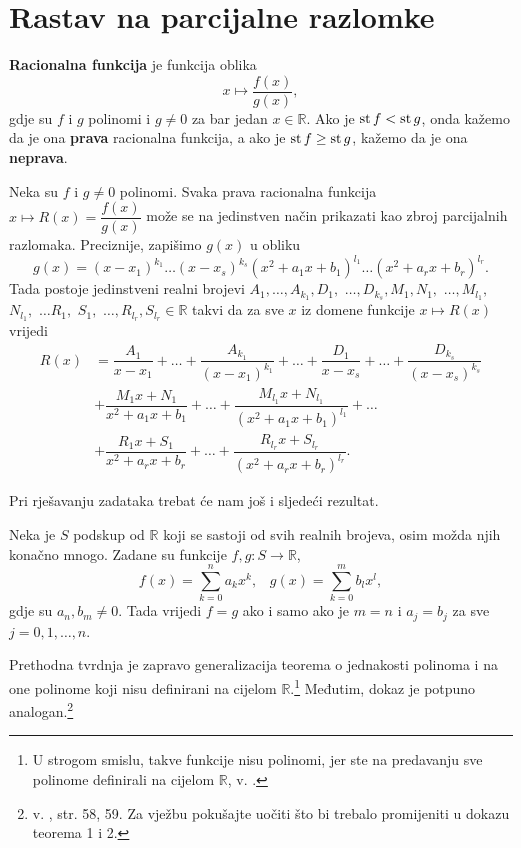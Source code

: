 \section{Rastav na parcijalne razlomke}

\begin{definition}
\textbf{Racionalna funkcija} je funkcija oblika
$$x\mapsto \dfrac{f(x)}{g(x)},$$
gdje su $f$ i $g$ polinomi i $g\neq 0$ za bar jedan $x\in \mathbb{R}$. Ako je $\operatorname{st}{f}<\operatorname{st}{g}$, onda kažemo da je ona \textbf{prava} racionalna funkcija, a ako je $\operatorname{st}{f}\geq \operatorname{st}{g}$, kažemo da je ona \textbf{neprava}.
\end{definition}

\begin{remark}
\label{partfrac}
Neka su $f$ i $g\neq 0$ polinomi. Svaka prava racionalna funkcija $x\mapsto R(x)=\dfrac{f(x)}{g(x)}$ može se na jedinstven način prikazati kao zbroj parcijalnih razlomaka. Preciznije, zapišimo $g(x)$ u obliku
$$g(x)=(x-x_1)^{k_1}\dots (x-x_s)^{k_s}(x^2+a_1x+b_1)^{l_1}\dots (x^2+a_rx+b_r)^{l_r}.$$
Tada postoje jedinstveni realni brojevi $A_1, \dots, A_{k_1}, D_1,$ $\dots, D_{k_s}, M_1, N_1,$ $ \dots, M_{l_1},$ $ N_{l_1},$ $ \dots R_1,$ $ S_1,$ $\dots, R_{l_r}, S_{l_r}\in \mathbb{R}$ takvi da za sve $x$ iz domene funkcije $x\mapsto R(x)$ vrijedi
\begin{align*}
R(x)&=\dfrac{A_1}{x-x_1}+\dots+\dfrac{A_{k_1}}{(x-x_1)^{k_1}}+\dots+\dfrac{D_1}{x-x_s}+\dots+\dfrac{D_{k_s}}{(x-x_s)^{k_s}} \\
&+\dfrac{M_1x+N_1}{x^2+a_1x+b_1}+\dots+\dfrac{M_{l_1}x+N_{l_1}}{(x^2+a_1x+b_1)^{l_1}}+\dots \\
&+\dfrac{R_1x+S_1}{x^2+a_rx+b_r}+\dots+\dfrac{R_{l_r}x+S_{l_r}}{(x^2+a_rx+b_r)^{l_r}}.
\end{align*}
\end{remark}
Pri rješavanju zadataka trebat će nam još i sljedeći rezultat.
\begin{remark}
\label{poleq}
Neka je $S$ podskup od $\mathbb{R}$ koji se sastoji od svih realnih brojeva, osim možda njih konačno mnogo. Zadane su funkcije $f, g : S\to \mathbb{R}$,
$$f(x)=\sum_{k=0}^n{a_kx^k},\;\;\;g(x)=\sum_{k=0}^m{b_lx^l},$$
gdje su $a_n, b_m\neq 0$. Tada vrijedi $f=g$ ako i samo ako je $m=n$ i $a_j=b_j$ za sve $j=0, 1, \dots, n$.
\end{remark}
Prethodna tvrdnja je zapravo generalizacija teorema o jednakosti polinoma i na one polinome koji nisu definirani na cijelom $\mathbb{R}$.\footnote{U strogom smislu, takve funkcije nisu polinomi, jer ste na predavanju sve polinome definirali na cijelom $\mathbb{R}$, v. \cite{3}.} Međutim, dokaz je potpuno analogan.\footnote{v. \cite{12}, str. 58, 59. Za vježbu pokušajte uočiti što bi trebalo promijeniti u dokazu teorema 1 i 2.}
